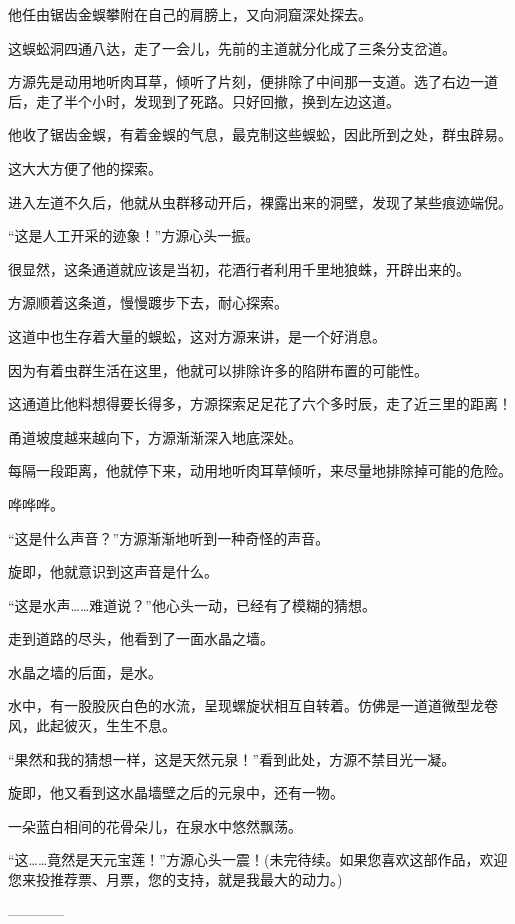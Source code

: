 \begin{this_body}
他任由锯齿金蜈攀附在自己的肩膀上，又向洞窟深处探去。

这蜈蚣洞四通八达，走了一会儿，先前的主道就分化成了三条分支岔道。

方源先是动用地听肉耳草，倾听了片刻，便排除了中间那一支道。选了右边一道后，走了半个小时，发现到了死路。只好回撤，换到左边这道。

他收了锯齿金蜈，有着金蜈的气息，最克制这些蜈蚣，因此所到之处，群虫辟易。

这大大方便了他的探索。

进入左道不久后，他就从虫群移动开后，裸露出来的洞壁，发现了某些痕迹端倪。

“这是人工开采的迹象！”方源心头一振。

很显然，这条通道就应该是当初，花酒行者利用千里地狼蛛，开辟出来的。

方源顺着这条道，慢慢踱步下去，耐心探索。

这道中也生存着大量的蜈蚣，这对方源来讲，是一个好消息。

因为有着虫群生活在这里，他就可以排除许多的陷阱布置的可能性。

这通道比他料想得要长得多，方源探索足足花了六个多时辰，走了近三里的距离！

甬道坡度越来越向下，方源渐渐深入地底深处。

每隔一段距离，他就停下来，动用地听肉耳草倾听，来尽量地排除掉可能的危险。

哗哗哗。

“这是什么声音？”方源渐渐地听到一种奇怪的声音。

旋即，他就意识到这声音是什么。

“这是水声……难道说？”他心头一动，已经有了模糊的猜想。

走到道路的尽头，他看到了一面水晶之墙。

水晶之墙的后面，是水。

水中，有一股股灰白色的水流，呈现螺旋状相互自转着。仿佛是一道道微型龙卷风，此起彼灭，生生不息。

“果然和我的猜想一样，这是天然元泉！”看到此处，方源不禁目光一凝。

旋即，他又看到这水晶墙壁之后的元泉中，还有一物。

一朵蓝白相间的花骨朵儿，在泉水中悠然飘荡。

“这……竟然是天元宝莲！”方源心头一震！(未完待续。如果您喜欢这部作品，欢迎您来投推荐票、月票，您的支持，就是我最大的动力。)

------------

\end{this_body}

